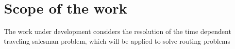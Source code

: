 \section{Scope of the work}

The work under development considers the resolution of the time dependent traveling salesman problem, 
which will be applied to solve routing problems